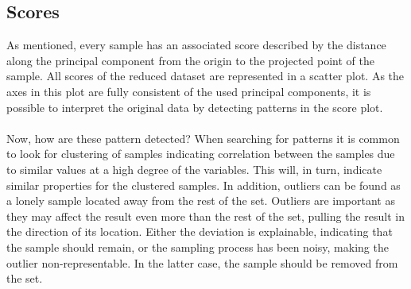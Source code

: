 \begin{figure}[H]
\begin{minipage}{\wd\FigBox}
    \centering\usebox{\FigBox}
  \end{minipage}
  \begin{minipage}{\wd\FigBox}
    \centering\usebox{\FigBox}
  \end{minipage}\hspace*{\FigHSkip}
\end{figure}


\subsection{Scores}
As mentioned, every sample has an associated score described by the distance along the principal component from the origin to the projected point of the sample. All scores of the reduced dataset are represented in a scatter plot. As the axes in this plot are fully consistent of the used principal components, it is possible to interpret the original data by detecting patterns in the score plot. 
\\\\
Now, how are these pattern detected? When searching for patterns it is common to look for clustering of samples indicating correlation between the samples due to similar values at a high degree of the variables. This will, in turn, indicate similar properties for the clustered samples. In addition, outliers can be found as a lonely sample located away from the rest of the set. Outliers are important as they may affect the result even more than the rest of the set, pulling the result in the direction of its location. Either the deviation is explainable, indicating that the sample should remain, or the sampling process has been noisy, making the outlier non-representable. In the latter case, the sample should be removed from the set. 

